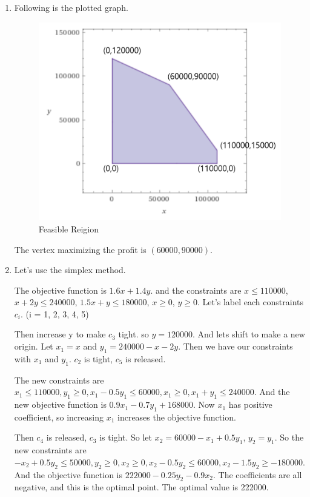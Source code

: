 \documentclass[a4paper,11pt]{article}
\begin{document}
\begin{enumerate}
\begin{enumerate}
\item
Following is the plotted graph.
\begin{figure}[hbt]
	\centering
	\includegraphics[scale=0.4]{figure1.png}
	\caption{Feasible Reigion}
\end{figure}

The vertex maximizing the profit is $(60000,90000)$.

\item

Let's use the simplex method.

The objective function is $1.6x + 1.4y$. and the constraints are $x \leq 110000$, $x+2y \leq 240000$, $1.5x+y \leq 180000$, $x \geq 0$, $y \geq 0$. Let's label each constraints $c_i$. (i = 1, 2, 3, 4, 5)

Then increase y to make $c_3$ tight. so $y = 120000$. And lets shift to make a new origin. Let $x_1 = x$ and $y_1 = 240000 - x - 2y$. Then we have our constraints with $x_1$ and $y_1$. $c_2 $ is tight, $c_5$ is released.

The new constraints are $x_1 \leq 110000, y_1 \geq 0, x_1 - 0.5 y_1 \leq 60000, x_1 \geq 0, x_1 + y_1 \leq 240000$. And the new objective function is $0.9x_1 - 0.7y_1 + 168000$. Now $x_1$ has positive coefficient, so increasing $x_1$ increases the objective function.

Then $c_4$ is released, $c_3$ is tight. So let $x_2 = 60000-x_1+0.5y_1$, $y_2 = y_1$. So the new constraints are $-x_2 + 0.5y_2  \leq 50000, y_2 \geq 0, x_2 \geq 0, x_2 - 0.5y_2 \leq 60000, x_2 - 1.5y_2 \geq -180000$. And the objective function is $222000 - 0.25y_2-0.9x_2$. The coefficients are all negative, and this is the optimal point. The optimal value is 222000.
\end{enumerate}



\end{enumerate}
\end{document}
